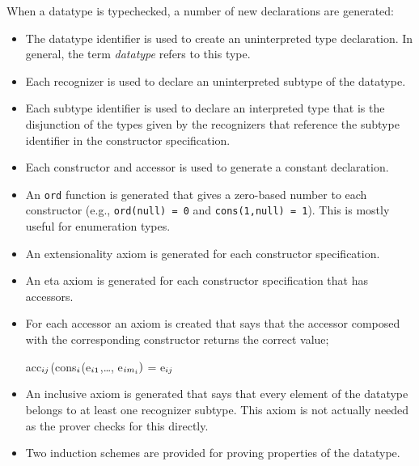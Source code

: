When a datatype is typechecked, a number of new declarations are
generated:
\begin{itemize}

\item The datatype identifier is used to create an uninterpreted type
declaration.  In general, the term \emph{datatype} refers to this type.

\item Each recognizer is used to declare an uninterpreted subtype of the
datatype.

\item Each subtype identifier is used to declare an interpreted type that
is the disjunction of the types given by the recognizers that reference
the subtype identifier in the constructor specification.

\item Each constructor and accessor is used to generate a constant
declaration.

\item An \texttt{ord} function is generated that gives a zero-based number
to each constructor (e.g., \texttt{ord(null) = 0} and \texttt{cons(1,null)
= 1}).  This is mostly useful for enumeration types.

\item An extensionality axiom is generated for each constructor
specification.

\item An eta axiom is generated for each constructor specification
that has accessors.

\item For each accessor an axiom is created that says that the accessor
composed with the corresponding constructor returns the correct value; \eg\
\begin{pvsex}
  acc\(\sb{ij}\)(cons\(\sb{i}\)(e\(\sb{i1}\),\ldots, e\(\sb{i{m\sb{i}}})\) = e\(\sb{ij}\)
\end{pvsex}


\item An inclusive axiom is generated that says that every element of
the datatype belongs to at least one recognizer subtype.  This axiom is
not actually needed as the prover checks for this directly.

\item Two induction schemes are provided for proving properties of the
datatype.


\end{itemize}
